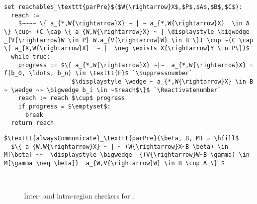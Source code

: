 \newsavebox{\parcheckers}
\begin{lrbox}{\parcheckers}%
\begin{minipage}{1\columnwidth}
\centering
\begin{lstlisting}[mathescape,escapechar=\`,morekeywords={set,return}]
set reachable$_\texttt{parPre}$($W{\rightarrow}X$,$P$,$A$,$B$,$C$):  
  reach :=
    $~~~~ \{ a_{*,W{\rightarrow}X} ~ | ~ a_{*,W{\rightarrow}X}  \in A \} \cup~ (C \cap \{ a_{W,W{\rightarrow}X} ~ | \displaystyle \bigwedge _{V{\rightarrow}W \in P} W.a_{V{\rightarrow}W} \in B \}) \cup ~(C \cap \{ a_{X,W{\rightarrow}X}  ~ |  \neg \exists X{\rightarrow}Y \in P\})$
  while true:    
    progress := $\{ a_{*,W{\rightarrow}X} ~|~  a_{*,W{\rightarrow}X} = f(b_0, \ldots, b_n) \in \texttt{F}$ `\Suppressnumber`
                   $\displaystyle \wedge ~ a_{*,W{\rightarrow}X} \in B ~ \wedge ~~ \bigwedge b_i \in ~$reach$\}$ `\Reactivatenumber`
    reach := reach $\cup$ progress
    if progress = $\emptyset$:
      break
  return reach  
\end{lstlisting}
\end{minipage}
\end{lrbox}

\newsavebox{\comcheckers}
\begin{lrbox}{\comcheckers}
\begin{minipage}{1\columnwidth}
\centering
\begin{lstlisting}[mathescape,escapechar=\`,morekeywords={set,return}]
$\texttt{alwaysCommunicate}_\texttt{parPre}(\beta, B, M) = \hfill$
  $\{ a_{W,W{\rightarrow}X} ~ | ~ (W{\rightarrow}X~B_\beta) \in M[\beta] ~~  \displaystyle \bigwedge _{(V{\rightarrow}W~B_\gamma) \in M[\gamma \neq \beta]}  a_{W,V{\rightarrow}W} \in B \cup A \} $
\end{lstlisting}




\end{minipage}
\end{lrbox}


\begin{figure}[t]
 \\
\caption{Inter- and intra-region checkers for .}
\label{fig:checkers}
\end{figure}
 
 
